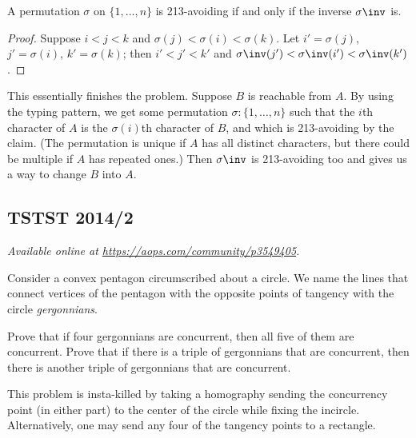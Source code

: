 \documentclass[11pt]{scrartcl}
\begin{document}
\begin{claim*}
  A permutation $\sigma$ on $\{1, \dots, n\}$
  is 213-avoiding if and only if the inverse $\sigma\inv$ is.
\end{claim*}
\begin{proof}
  Suppose $i < j < k$ and $\sigma(j) < \sigma(i) < \sigma(k)$.
  Let $i' = \sigma(j)$, $j' = \sigma(i)$, $k' = \sigma(k)$;
  then $i' < j' < k'$ and $\sigma\inv(j') < \sigma\inv(i') < \sigma\inv(k')$.
\end{proof}

This essentially finishes the problem.
Suppose $B$ is reachable from $A$.
By using the typing pattern,
we get some permutation $\sigma \colon \{1, \dots, n\}$
such that the $i$th character of $A$
is the $\sigma(i)$th character of $B$,
and which is 213-avoiding by the claim.
(The permutation is unique if $A$ has all distinct characters,
but there could be multiple if $A$ has repeated ones.)
Then $\sigma\inv$ is 213-avoiding too
and gives us a way to change $B$ into $A$.
\pagebreak

\subsection{TSTST 2014/2}
\textsl{Available online at \url{https://aops.com/community/p3549405}.}
\begin{mdframed}[style=mdpurplebox,frametitle={Problem statement}]
Consider a convex pentagon circumscribed about a circle.
We name the lines that connect vertices of the pentagon with
the opposite points of tangency with the circle \emph{gergonnians}.
\begin{enumerate}
  \ii[(a)] Prove that if four gergonnians are concurrent,
    then all five of them are concurrent.
  \ii[(b)] Prove that if there is a triple of gergonnians
    that are concurrent, then there is another triple
    of gergonnians that are concurrent.
\end{enumerate}
\end{mdframed}
This problem is insta-killed by taking a homography
sending the concurrency point (in either part)
to the center of the circle while fixing the incircle.
Alternatively, one may send any four of the tangency points to a rectangle.
\end{document}
